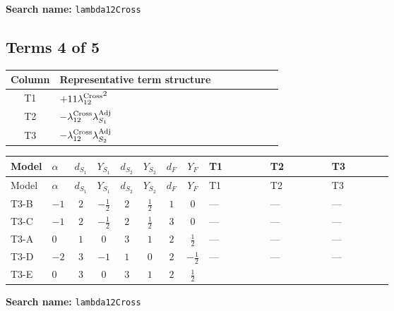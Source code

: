 \documentclass[8pt]{article}
\begin{document}
\begin{landscape}
\begin{longtable}{@{}llcccccc >{\raggedright\arraybackslash}p{0.21\linewidth} >{\raggedright\arraybackslash}p{0.21\linewidth} >{\raggedright\arraybackslash}p{0.21\linewidth}@{}}
\midrule
\bottomrule
\end{longtable}
\clearpage
\noindent\textbf{Search name: }\texttt{lambda12Cross}\par\smallskip
\subsection*{Terms 4 of 5}
\begin{center}
\begin{tabular}{@{}c >{\raggedright\arraybackslash}p{0.82\linewidth}@{}}
\toprule
Column & Representative term structure \\
\midrule
T1 & \(\displaystyle +11 {\lambda_{12}^{\rm Cross}}^2\) \\
\midrule
T2 & \(\displaystyle -{\lambda_{12}^{\rm Cross}} {\lambda_{S_1}^{\rm Adj}}\) \\
\midrule
T3 & \(\displaystyle -{\lambda_{12}^{\rm Cross}} {\lambda_{S_2}^{\rm Adj}}\) \\
\midrule
\bottomrule
\end{tabular}
\end{center}
\smallskip
\tiny
\begin{longtable}{@{}llcccccc >{\raggedright\arraybackslash}p{0.21\linewidth} >{\raggedright\arraybackslash}p{0.21\linewidth} >{\raggedright\arraybackslash}p{0.21\linewidth}@{}}
\toprule
Model & $\alpha$ & $d_{S_1}$ & $Y_{S_1}$ & $d_{S_2}$ & $Y_{S_2}$ & $d_F$ & $Y_F$ & T1 & T2 & T3 \\
\midrule
\endfirsthead
\toprule
Model & $\alpha$ & $d_{S_1}$ & $Y_{S_1}$ & $d_{S_2}$ & $Y_{S_2}$ & $d_F$ & $Y_F$ & T1 & T2 & T3 \\
\midrule
\endhead
T3-B & $-1$ & $2$ & $-\frac{1}{2}$ & $2$ & $\frac{1}{2}$ & $1$ & $0$ & --- & --- & --- \\
\midrule
T3-C & $-1$ & $2$ & $-\frac{1}{2}$ & $2$ & $\frac{1}{2}$ & $3$ & $0$ & --- & --- & --- \\
\midrule
T3-A & $0$ & $1$ & $0$ & $3$ & $1$ & $2$ & $\frac{1}{2}$ & --- & --- & --- \\
\midrule
T3-D & $-2$ & $3$ & $-1$ & $1$ & $0$ & $2$ & $-\frac{1}{2}$ & --- & --- & --- \\
\midrule
T3-E & $0$ & $3$ & $0$ & $3$ & $1$ & $2$ & $\frac{1}{2}$ & \scriptsize\adjustbox{max width=\linewidth}{$\begin{gathered} +11 {\lambda_{12}^{\rm Cross}}^2\end{gathered}$} & \scriptsize\adjustbox{max width=\linewidth}{$\begin{gathered} -{\lambda_{12}^{\rm Cross}} {\lambda_{S_1}^{\rm Adj}}\end{gathered}$} & \scriptsize\adjustbox{max width=\linewidth}{$\begin{gathered} -{\lambda_{12}^{\rm Cross}} {\lambda_{S_2}^{\rm Adj}}\end{gathered}$} \\
\midrule
\bottomrule
\end{longtable}
\clearpage
\noindent\textbf{Search name: }\texttt{lambda12Cross}\par\smallskip

\end{landscape}
\end{document}
